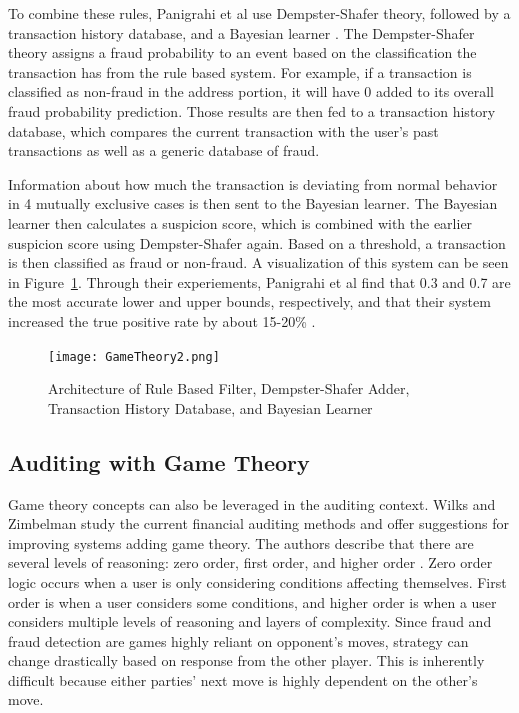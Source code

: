 \documentclass[midd]{thesis}
\begin{document}
To combine these rules, Panigrahi et al use Dempster-Shafer theory, followed by a transaction history database, and a Bayesian learner \cite{Panigrahi2009}. The Dempster-Shafer theory assigns a fraud probability to an event based on the classification the transaction has from the rule based system. For example, if a transaction is classified as non-fraud in the address portion, it will have 0 added to its overall fraud probability prediction. Those results are then fed to a transaction history database, which compares the current transaction with the user's past transactions as well as a generic database of fraud. 

Information about how much the transaction is deviating from normal behavior in 4 mutually exclusive cases is then sent to the Bayesian learner. The Bayesian learner then calculates a suspicion score, which is combined with the earlier suspicion score using Dempster-Shafer again. Based on a threshold, a transaction is then classified as fraud or non-fraud. A visualization of this system can be seen in Figure~\ref{fig:gametheory2}. Through their experiements, Panigrahi et al find that 0.3 and 0.7 are the most accurate lower and upper bounds, respectively, and that their system increased the true positive rate by about 15-20\% \cite{Panigrahi2009}. 



\begin{figure} \centering
  \texttt{[image: GameTheory2.png]}
  \caption{Architecture of Rule Based Filter, Dempster-Shafer Adder, Transaction History Database, and Bayesian Learner}
  \label{fig:gametheory2}
\end{figure}


\subsection{Auditing with Game Theory}

Game theory concepts can also be leveraged in the auditing context. Wilks and Zimbelman study the current financial auditing methods and offer suggestions for improving systems adding game theory. The authors describe that there are several levels of reasoning: zero order, first order, and higher order \cite{Wilks2004}. Zero order logic occurs when a user is only considering conditions affecting themselves. First order is when a user considers some conditions, and higher order is when a user considers multiple levels of reasoning and layers of complexity. Since fraud and fraud detection are games highly reliant on opponent's moves, strategy can change drastically based on response from the other player. This is inherently difficult because either parties' next move is highly dependent on the other's move. 
\end{document}
